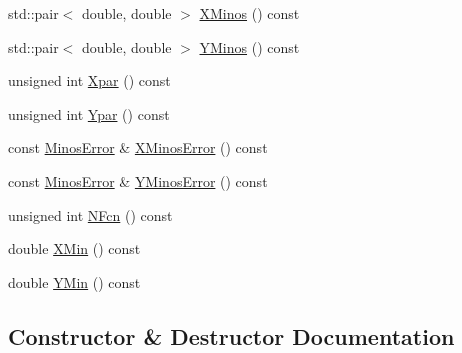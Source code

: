 \begin{DoxyCompactItemize}
\item 
std\+::pair$<$ double, double $>$ \mbox{\hyperlink{classROOT_1_1Minuit2_1_1ContoursError_afd1906c6e1b9ddd74363df072590183f}{X\+Minos}} () const
\item 
std\+::pair$<$ double, double $>$ \mbox{\hyperlink{classROOT_1_1Minuit2_1_1ContoursError_a181d8326a32d95dd0f619bcb63076c00}{Y\+Minos}} () const
\item 
unsigned int \mbox{\hyperlink{classROOT_1_1Minuit2_1_1ContoursError_a4f04b22b326b30c5a1bf3c0435544e8d}{Xpar}} () const
\item 
unsigned int \mbox{\hyperlink{classROOT_1_1Minuit2_1_1ContoursError_a3d118d7b9c49e6835130e0ce50b94b18}{Ypar}} () const
\item 
const \mbox{\hyperlink{classROOT_1_1Minuit2_1_1MinosError}{Minos\+Error}} \& \mbox{\hyperlink{classROOT_1_1Minuit2_1_1ContoursError_a0d14fdab181f06ddd1b38e7dc763718b}{X\+Minos\+Error}} () const
\item 
const \mbox{\hyperlink{classROOT_1_1Minuit2_1_1MinosError}{Minos\+Error}} \& \mbox{\hyperlink{classROOT_1_1Minuit2_1_1ContoursError_a7ca7b0f224597473592c8da5a5825d61}{Y\+Minos\+Error}} () const
\item 
unsigned int \mbox{\hyperlink{classROOT_1_1Minuit2_1_1ContoursError_a1342abcb15690e6897ad860e7f05026d}{N\+Fcn}} () const
\item 
double \mbox{\hyperlink{classROOT_1_1Minuit2_1_1ContoursError_ac0dbac1ec08765a632908c88c5f24822}{X\+Min}} () const
\item 
double \mbox{\hyperlink{classROOT_1_1Minuit2_1_1ContoursError_ac2bd4c328fe62d04b2809d9e0730efe3}{Y\+Min}} () const
\end{DoxyCompactItemize}


\subsection{Constructor \& Destructor Documentation}
\mbox{\label{classROOT_1_1Minuit2_1_1ContoursError_abe494ac0098e41bf38fd4023e018e340}} 
